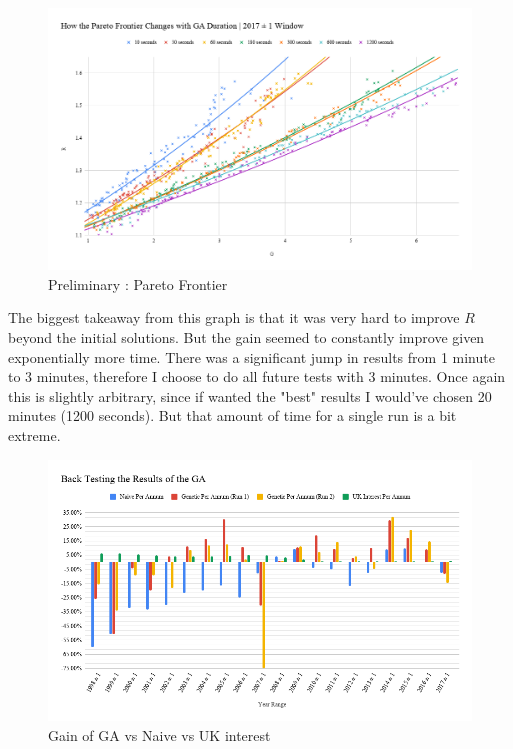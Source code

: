 \documentclass[11pt]{article}
\begin{document}
    \begin{figure}[H] %
        \includegraphics[width=\textwidth]{HowTheParetoFrontierChangesWithGADuration_2017-1Window}
        \caption{Preliminary : Pareto Frontier}
            \label{fig:HowTheParetoFrontierChangesWithGADuration_2017-1Window}
    \end{figure}

    The biggest takeaway from this graph is that it was very hard to improve \(R\) beyond
    the initial solutions. But the gain seemed to constantly improve given exponentially
    more time. There was a significant jump in results from 1 minute to 3 minutes,
    therefore I choose to do all future tests with 3 minutes. Once again this is slightly
    arbitrary, since if wanted the "best" results I would've chosen 20 minutes (1200 seconds).
    But that amount of time for a single run is a bit extreme.

    \begin{figure}[H] %
        \includegraphics[width=\textwidth]{BackTestingTheResultsOfTheGA}
        \caption{Gain of GA vs Naive vs UK interest}
            \label{fig:BackTestingTheResultsOfTheGA}
    \end{figure}
\end{document}
